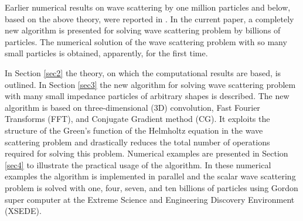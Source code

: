 \documentclass[12pt]{elsarticle}
\numberwithin{equation}{section}
\begin{document}
Earlier numerical results on wave scattering by one million particles and below, based on the above theory, were reported in \cite{Tran}. In the current paper, a completely new algorithm is presented for solving wave scattering problem by  billions of particles. The numerical solution of the wave scattering problem with so many small particles is obtained, apparently, for the first time.

In  Section \ref{sec2} the theory, on which the computational results are based, is outlined. In  Section \ref{sec3} the new
algorithm for solving wave scattering problem with many small impedance particles of arbitrary shapes is described.
The new algorithm is based on three-dimensional (3D) convolution, Fast Fourier Transforms (FFT), and Conjugate Gradient method (CG). It exploits the structure of the Green's function of the Helmholtz equation in the wave scattering problem and drastically reduces the total number of operations required for solving this problem.  Numerical examples are presented in Section \ref{sec4} to illustrate the practical usage of the algorithm. In these numerical examples the algorithm is implemented in parallel and the scalar wave scattering problem is solved with one, four, seven, and ten billions of particles using Gordon super computer at the Extreme Science and Engineering Discovery Environment (XSEDE).
\end{document}
